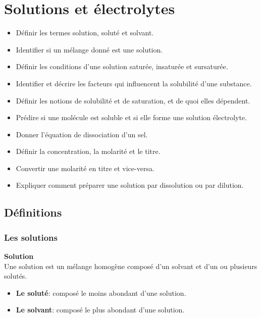 \documentclass[
  11pt,
  a4paper,
  openany]{book}
\providecommand{\tightlist}{%
  \setlength{\itemsep}{0pt}\setlength{\parskip}{0pt}}
\begin{document}
\chapter{Solutions et électrolytes}\label{solutions-et-uxe9lectrolytes}

\begin{objectives}

\begin{itemize}
\tightlist
\item
  Définir les termes solution, soluté et solvant.
\item
  Identifier si un mélange donné est une solution.
\item
  Définir les conditions d'une solution saturée, insaturée et sursaturée.
\item
  Identifier et décrire les facteurs qui influencent la solubilité d'une substance.
\item
  Définir les notions de solubilité et de saturation, et de quoi elles dépendent.
\item
  Prédire si une molécule est soluble et si elle forme une solution électrolyte.
\item
  Donner l'équation de dissociation d'un sel.
\item
  Définir la concentration, la molarité et le titre.
\item
  Convertir une molarité en titre et vice-versa.
\item
  Expliquer comment préparer une solution par dissolution ou par dilution.
\end{itemize}

\end{objectives}

\section{Définitions}\label{duxe9finitions}

\subsection{Les solutions}\label{les-solutions}

\begin{tcolorbox}
\textbf{Solution}\\
Une solution est un mélange homogène composé d'un solvant et d'un ou plusieurs solutés.

\end{tcolorbox}

\begin{itemize}
\tightlist
\item
  \textbf{Le soluté}: composé le moins abondant d'une solution.
\item
  \textbf{Le solvant}: composé le plus abondant d'une solution.
\end{itemize}
\end{document}
